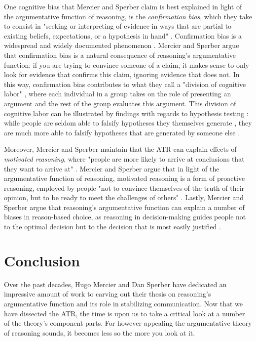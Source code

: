 One cognitive bias that Mercier and Sperber claim is best explained in light of the argumentative function of reasoning, is the \emph{confirmation bias}, which they take to consist in "seeking or interpreting of evidence in ways that are partial to existing beliefs, expectations, or a hypothesis in hand" \citep[p.~175]{Nickerson98}. Confirmation bias is a widespread and widely documented phenomenon \citep[see][for a review]{Nickerson98}. Mercier and Sperber argue that confirmation bias is a natural consequence of reasoning's argumentative function: if you are trying to convince someone of a claim, it makes sense to only look for evidence that confirms this claim, ignoring evidence that does not. In this way, confirmation bias contributes to what they call a "division of cognitive labor" \citep[p.~65]{MS11}, where each individual in a group takes on the role of presenting an argument and the rest of the group evaluates this argument.
This division of cognitive labor can be illustrated by findings with regards to hypothesis testing \citep[cf.][]{Wason60}: while people are seldom able to falsify hypotheses they themselves generate \citep{Tweney80}, they are much more able to falsify hypotheses that are generated by someone else \citep{Cowley05}.

Moreover, Mercier and Sperber maintain that the ATR can explain effects of \emph{motivated reasoning}, where "people are more likely to arrive at conclusions that they want to arrive at" \citep{Kunda90}.
Mercier and Sperber argue that in light of the argumentative function of reasoning, motivated reasoning is a form of proactive reasoning, employed by people "not to convince themselves of the truth of their opinion, but to be ready to meet the challenges of others" \citep[p.~66]{MS11}.
Lastly, Mercier and Sperber argue that reasoning's argumentative function can explain a number of biases in reason-based choice, as reasoning in decision-making guides people not to the optimal decision but to the decision that is most easily justified \citep[cf.][]{Shafir93}.

\section{Conclusion}

Over the past decades, Hugo Mercier and Dan Sperber have dedicated an impressive amount of work to carving out their thesis on reasoning's argumentative function and its role in stabilizing communication.
Now that we have dissected the ATR, the time is upon us to take a critical look at a number of the theory's component parts.
For however appealing the argumentative theory of reasoning sounds, it becomes less so the more you look at it.
